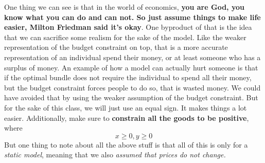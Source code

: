 \documentclass{article}
\begin{document}
One thing we can see is that in the world of economics, \textbf{you are God, you know what you can do and can not. So just assume things to make life easier, Milton Friedman said it's okay}. One byproduct of that is the idea that we can sacrifice some realism for the sake of the model. Like the weaker representation of the budget constraint on top, that is a more accurate representation of an individual spend their money, or at least someone who has a surplus of money. An example of how a model can actually hurt someone is that if the optimal bundle does not require the individual to spend all their money, but the budget constraint forces people to do so, that is wasted money. We could have avoided that by using the weaker assumption of the budget constraint. But for the sake of this class, we will just use an equal sign. It makes things a lot easier. Additionally, make sure to \textbf{constrain all the goods to be positive}, where 
\[
x \geq 0, y \geq 0
\]
But one thing to note about all the above stuff is that all of this is only for a \textit{static model}, meaning that we also \textit{assumed that prices do not change.}
\end{document}
